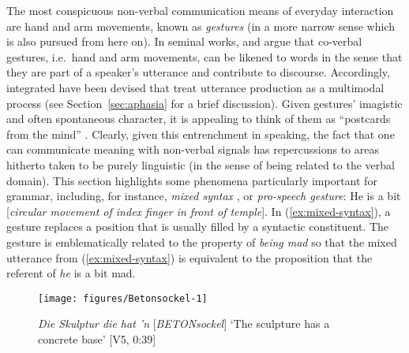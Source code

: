\documentclass[output=paper
 	        ,biblatex
                ,babelshorthands
                ,newtxmath
                ,draftmode
                ,colorlinks, citecolor=brown
]{langscibook}
\begin{document}
The most conspicuous non-verbal communication means of everyday interaction are hand and arm movements, known as \emph{gestures} (in a more narrow sense which is also pursued from here on).
%
In seminal works, \citet{McNeill:1985,McNeill:1992} and \citet{Kendon:1980,Kendon:2004} argue that co-verbal gestures, i.e.\ hand and arm movements, can be likened to words in the sense that they are part of a speaker's utterance and contribute to discourse.
%
Accordingly, integrated  have been devised \citep{Kita:Ozyurek:2003,de:Ruiter:2000,Krauss:Chen:Gottesmann:2000} that treat utterance production as a multimodal process (see Section~\ref{sec:aphasia} for a brief discussion).
%
Given gestures' imagistic and often spontaneous character, it is appealing to think of them as \enquote{postcards from the mind} \citep[21]{de:Ruiter:2007:a}.
%
Clearly, given this entrenchment in speaking, the fact that one can communicate meaning with non-verbal signals has repercussions to areas hitherto taken to be purely linguistic (in the sense of being related to the verbal domain).
%
This section highlights some phenomena particularly important for grammar, including, for instance,  \emph{mixed syntax} \citep{Slama-Cazacu:1976}, or \emph{pro-speech gesture}:
%
\ea \label{ex:mixed-syntax}
He is a bit [\textit{circular movement of index finger in front of temple}].
\z
%
In (\ref{ex:mixed-syntax}), a gesture replaces a position that is usually filled by a syntactic constituent.
%
The gesture is emblematically related to the property of \textit{being mad} so that the mixed utterance from (\ref{ex:mixed-syntax}) is equivalent to the proposition that the referent of \textit{he} is a bit mad.

\begin{figure}
  \centering
  \texttt{[image: figures/Betonsockel-1]}
  \caption[Sculpture]{\textit{Die Skulptur die hat 'n} [\textit{BETONsockel}] \enquote*{The sculpture has a concrete base} [V5, 0:39]}
  \label{fig:betonsockel}
\end{figure}
\end{document}
